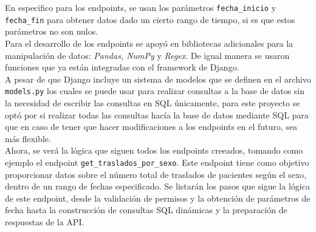 En especifico para los endpoints, se usan los parámetros \texttt{fecha\_inicio} y \texttt{fecha\_fin} para obtener datos dado un cierto rango de tiempo, si es que estos parámetros no son nulos.\\

Para el desarrollo de los endpoints se apoyó en bibliotecas adicionales para la manipulación de datos: \textit{Pandas, NumPy} y \textit{Regex}. De igual manera se usaron funciones que ya están integradas con el framework de Django.\\
A pesar de que Django incluye un sistema de modelos que se definen en el archivo \texttt{models.py} los cuales se puede usar para realizar consultas a la base de datos sin la necesidad de escribir las consultas en SQL únicamente, para este proyecto se optó por si realizar todas las consultas hacía la base de datos mediante SQL para que en caso de tener que hacer modificaciones a los endpoints en el futuro, sea más flexible.\\

Ahora, se verá la lógica que siguen todos los endpoints creeados, tomando como ejemplo el endpoint \texttt{get\_traslados\_por\_sexo}. Este endpoint tiene como objetivo proporcionar datos sobre el número total de traslados de pacientes según el sexo, dentro de un rango de fechas especificado. Se listarán los pasos que sigue la lógica de este endpoint, desde la validación de permisos y la obtención de parámetros de fecha hasta la construcción de consultas SQL dinámicas y la preparación de respuestas de la API.\\

